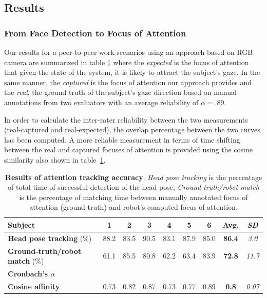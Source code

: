 \documentclass{sig-alternate}
\begin{document}
\subsection{Results}

\subsubsection{From Face Detection to Focus of Attention} \label{fromFaceTo}


Our results for a peer-to-peer work scenarios using an approach based on RGB
camera are summarized in table \ref{tab:results} where the \textit{expected} is
the focus of attention that given the state of the system, it is likely to
attract the subject's gaze. In the same manner, the \textit{captured} is the
focus of attention our approach provides and the \textit{real}, the ground truth
of the subject's gaze direction based on manual annotations from two evaluators
with an average reliability of $ \alpha = .89 $.

In order to calculate the inter-rater reliability between the two measurements
(real-captured and real-expected), the overlap percentage between the two
curves
has been computed. A more reliable measurement in terms of time shifting between
the real and captured focuses of attention is provided using the cosine
similarity also shown in table~\ref{tab:results}. 

\begin{table}[h!]
    \centering
    \caption{\textbf{Results of attention tracking accuracy}. \emph{Head pose
    tracking} is the percentage of total time of successful detection of the
    head pose; \emph{Ground-truth/robot match} is the percentage of matching time
    between manually annotated focus of attention (ground-truth) and robot's
    computed focus of attention.}

    \begin{tabular}{p{5.5cm}cccccccc}
        \toprule
        {\bf Subject} & 1 & 2 & 3 & 4 & 5 & 6 & {\bf Avg.} & {\it SD} \\
        \midrule
        {\bf Head pose tracking} (\%) & 88.2 & 83.5 & 90.5 & 83.1 & 87.9 & 85.0 & {\bf 86.4} & {\it 3.0} \\ 
        \midrule
        {\bf Ground-truth/robot match} (\%) & 61.1 & 85.5 & 80.8 & 62.2 & 63.4 & 83.9 & {\bf 72.8} & {\it 11.7}\\
        {\bf Cronbach's $\alpha$} &  & & & & & & & \\
        {\bf Cosine affinity} & 0.73 & 0.82 & 0.87 & 0.73 & 0.77 & 0.89 & {\bf 0.8} & {\it 0.07} \\
        \bottomrule
    \end{tabular}
    \label{tab:results}
\end{table}
\end{document}

